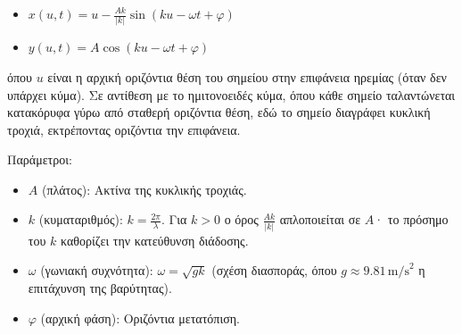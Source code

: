 \documentclass[a4paper, 11pt]{article}
\providecommand{\tightlist}{\setlength{\itemsep}{0pt}\setlength{\parskip}{0pt}}
\begin{document}
\begin{itemize}
\tightlist
\item
  \(x(u, t) = u - \frac{A k}{|k|} \sin(k u - \omega t + \varphi)\)
\item
  \(y(u, t) = A \cos(k u - \omega t + \varphi)\)
\end{itemize}

όπου \(u\) είναι η αρχική οριζόντια θέση του σημείου στην επιφάνεια
ηρεμίας (όταν δεν υπάρχει κύμα). Σε αντίθεση με το ημιτονοειδές κύμα,
όπου κάθε σημείο ταλαντώνεται κατακόρυφα γύρω από σταθερή οριζόντια
θέση, εδώ το σημείο διαγράφει κυκλική τροχιά, εκτρέποντας οριζόντια την
επιφάνεια.

Παράμετροι:

\begin{itemize}
\tightlist
\item
  \(A\) (πλάτος): Ακτίνα της κυκλικής τροχιάς.
\item
  \(k\) (κυματαριθμός): \(k = \frac{2\pi}{\lambda}\). Για \(k>0\) ο όρος
  \(\frac{A k}{|k|}\) απλοποιείται σε \(A\)· το πρόσημο του \(k\)
  καθορίζει την κατεύθυνση διάδοσης.
\item
  \(\omega\) (γωνιακή συχνότητα): \(\omega = \sqrt{g k}\) (σχέση
  διασποράς, όπου \(g\approx 9.81\,\text{m/s}^2\) η επιτάχυνση της
  βαρύτητας).
\item
  \(\varphi\) (αρχική φάση): Οριζόντια μετατόπιση.
\end{itemize}
\end{document}
